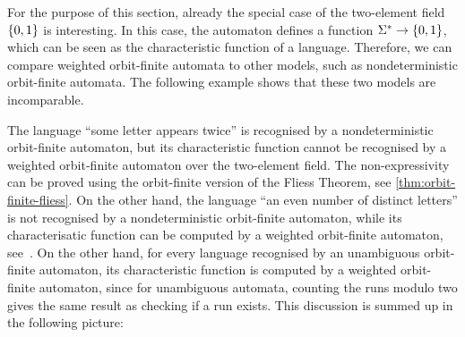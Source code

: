 For the purpose of this section, already the special case of the two-element field $\{0,1\}$ is interesting. In this case, the automaton defines a function $\Sigma^* \to \{0,1\}$, which can be seen as the characteristic function of a language. Therefore, we can compare weighted orbit-finite automata to other models, such as nondeterministic orbit-finite automata. The following example shows that these two  models are incomparable. 

\begin{myexample}
    The language ``some letter appears twice'' is recognised by a nondeterministic orbit-finite automaton, but its characteristic function cannot be  recognised by a weighted orbit-finite automaton over the two-element field. The non-expressivity can be proved using the orbit-finite version of the Fliess Theorem, see \cref{thm:orbit-finite-fliess}. On the other hand, the  language ``an even number of distinct letters'' is not recognised by a nondeterministic orbit-finite automaton, while its characterisatic function can  be computed by a weighted orbit-finite automaton, see~\cite[Example 3.2]{orbitFiniteVectorTheoretics}. On the other hand, for every language recognised by an unambiguous orbit-finite automaton, its characteristic function is computed by a weighted orbit-finite automaton, since for unambiguous automata, counting the runs modulo two gives the same result as checking if a run exists. This discussion is summed up in the following picture:
\end{myexample}

